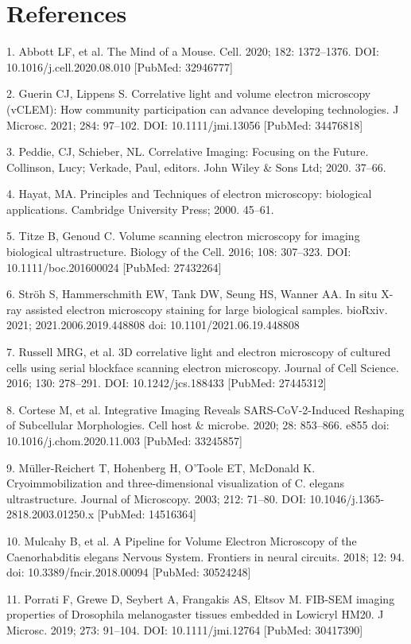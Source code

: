 \documentclass{article}
\begin{document}
\section*{References}
\begin{hangpars}

1. Abbott LF, et al. The Mind of a Mouse. Cell. 2020; 182: 1372–1376. DOI: 10.1016/j.cell.2020.08.010 [PubMed: 32946777]

2. Guerin CJ, Lippens S. Correlative light and volume electron microscopy (vCLEM): How community participation can advance developing technologies. J Microsc. 2021; 284: 97–102. DOI: 10.1111/jmi.13056 [PubMed: 34476818]

3. Peddie, CJ, Schieber, NL. Correlative Imaging: Focusing on the Future. Collinson, Lucy; Verkade, Paul, editors. John Wiley \& Sons Ltd; 2020. 37–66.

4. Hayat, MA. Principles and Techniques of electron microscopy: biological applications. Cambridge University Press; 2000. 45–61.

5. Titze B, Genoud C. Volume scanning electron microscopy for imaging biological ultrastructure. Biology of the Cell. 2016; 108: 307–323. DOI: 10.1111/boc.201600024 [PubMed: 27432264]

6. Ströh S, Hammerschmith EW, Tank DW, Seung HS, Wanner AA. In situ X-ray assisted electron microscopy staining for large biological samples. bioRxiv. 2021; 2021.2006.2019.448808 doi: 10.1101/2021.06.19.448808

7. Russell MRG, et al. 3D correlative light and electron microscopy of cultured cells using serial blockface scanning electron microscopy. Journal of Cell Science. 2016; 130: 278–291. DOI: 10.1242/jcs.188433 [PubMed: 27445312]

8. Cortese M, et al. Integrative Imaging Reveals SARS-CoV-2-Induced Reshaping of Subcellular Morphologies. Cell host \& microbe. 2020; 28: 853–866. e855 doi: 10.1016/j.chom.2020.11.003 [PubMed: 33245857]

9. Müller-Reichert T, Hohenberg H, O’Toole ET, McDonald K. Cryoimmobilization and three-dimensional visualization of C. elegans ultrastructure. Journal of Microscopy. 2003; 212: 71–80. DOI: 10.1046/j.1365-2818.2003.01250.x [PubMed: 14516364]

10. Mulcahy B, et al. A Pipeline for Volume Electron Microscopy of the Caenorhabditis elegans Nervous System. Frontiers in neural circuits. 2018; 12: 94. doi: 10.3389/fncir.2018.00094 [PubMed: 30524248]

11. Porrati F, Grewe D, Seybert A, Frangakis AS, Eltsov M. FIB-SEM imaging properties of Drosophila melanogaster tissues embedded in Lowicryl HM20. J Microsc. 2019; 273: 91–104. DOI: 10.1111/jmi.12764 [PubMed: 30417390]


\end{hangpars}
\end{document}
